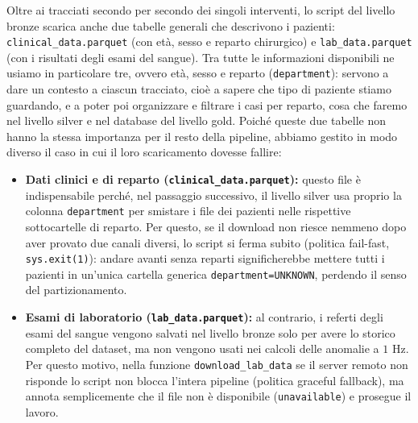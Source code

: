 Oltre ai tracciati secondo per secondo dei singoli interventi, lo script del livello bronze scarica anche due tabelle generali che descrivono i pazienti: \texttt{clinical\_\allowbreak data.parquet} (con et\`a, sesso e reparto chirurgico) e \texttt{lab\_\allowbreak data.parquet} (con i risultati degli esami del sangue). Tra tutte le informazioni disponibili ne usiamo in particolare tre, ovvero et\`a, sesso e reparto (\texttt{department}): servono a dare un contesto a ciascun tracciato, cio\`e a sapere che tipo di paziente stiamo guardando, e a poter poi organizzare e filtrare i casi per reparto, cosa che faremo nel livello silver e nel database del livello gold. Poich\'e queste due tabelle non hanno la stessa importanza per il resto della pipeline, abbiamo gestito in modo diverso il caso in cui il loro scaricamento dovesse fallire:
\begin{itemize}
    \item \textbf{Dati clinici e di reparto (\texttt{clinical\_data.parquet}):} questo file \`e indispensabile perch\'e, nel passaggio successivo, il livello silver usa proprio la colonna \texttt{department} per smistare i file dei pazienti nelle rispettive sottocartelle di reparto. Per questo, se il download non riesce nemmeno dopo aver provato due canali diversi, lo script si ferma subito (politica fail-fast, \texttt{sys.exit(1)}): andare avanti senza reparti significherebbe mettere tutti i pazienti in un'unica cartella generica \texttt{department=\allowbreak UNKNOWN}, perdendo il senso del partizionamento.    \item \textbf{Esami di laboratorio (\texttt{lab\_data.parquet}):} al contrario, i referti degli esami del sangue vengono salvati nel livello bronze solo per avere lo storico completo del dataset, ma non vengono usati nei calcoli delle anomalie a $1\text{ Hz}$. Per questo motivo, nella funzione \texttt{download\_\allowbreak lab\_data} se il server remoto non risponde lo script non blocca l'intera pipeline (politica graceful fallback), ma annota semplicemente che il file non \`e disponibile (\texttt{unavailable}) e prosegue il lavoro.\end{itemize}

